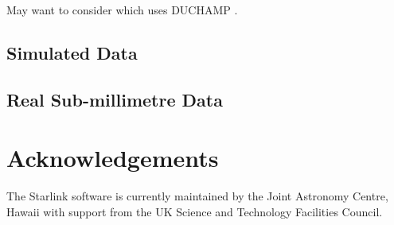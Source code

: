 \documentclass[final,authoryear,5p,times,twocolumn]{elsarticle}
\begin{document}
May want to consider \citep{2012PASA...29..301W} which uses
DUCHAMP \citep[][]{2012MNRAS.421.3242W}.

\subsection{Simulated Data}

\subsection{Real Sub-millimetre Data}


\section{Acknowledgements}

The Starlink software is currently maintained by the Joint Astronomy
Centre, Hawaii with support from the UK Science and Technology
Facilities Council.




\end{document}
